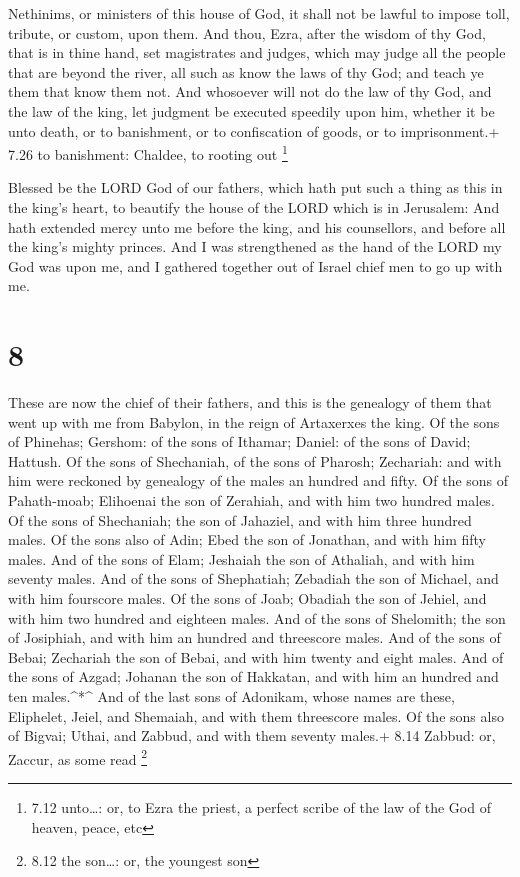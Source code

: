 Nethinims, or ministers of this house of God, it shall not be lawful to
impose toll, tribute, or custom, upon them.  And thou,
Ezra, after the wisdom of thy God, that is in thine hand, set
magistrates and judges, which may judge all the people that are beyond
the river, all such as know the laws of thy God; and teach ye them that
know them not.  And whosoever will not do the law of thy
God, and the law of the king, let judgment be executed speedily upon
him, whether it be unto death, or to banishment, or to confiscation of
goods, or to imprisonment.+ 7.26 to banishment: Chaldee, to rooting out
\footnote{7.12 unto\ldots: or, to Ezra the priest, a perfect scribe of
  the law of the God of heaven, peace, etc}

 Blessed be the LORD God of our fathers, which hath put
such a thing as this in the king's heart, to beautify the house of the
LORD which is in Jerusalem:  And hath extended mercy unto
me before the king, and his counsellors, and before all the king's
mighty princes. And I was strengthened as the hand of the LORD my God
was upon me, and I gathered together out of Israel chief men to go up
with me.

\hypertarget{section-7}{%
\section{8}\label{section-7}}

 These are now the chief of their fathers, and this is the
genealogy of them that went up with me from Babylon, in the reign of
Artaxerxes the king.  Of the sons of Phinehas; Gershom: of
the sons of Ithamar; Daniel: of the sons of David; Hattush. 
Of the sons of Shechaniah, of the sons of Pharosh; Zechariah: and with
him were reckoned by genealogy of the males an hundred and fifty.
 Of the sons of Pahath-moab; Elihoenai the son of Zerahiah,
and with him two hundred males.  Of the sons of Shechaniah;
the son of Jahaziel, and with him three hundred males.  Of
the sons also of Adin; Ebed the son of Jonathan, and with him fifty
males.  And of the sons of Elam; Jeshaiah the son of
Athaliah, and with him seventy males.  And of the sons of
Shephatiah; Zebadiah the son of Michael, and with him fourscore males.
 Of the sons of Joab; Obadiah the son of Jehiel, and with
him two hundred and eighteen males.  And of the sons of
Shelomith; the son of Josiphiah, and with him an hundred and threescore
males.  And of the sons of Bebai; Zechariah the son of
Bebai, and with him twenty and eight males.  And of the
sons of Azgad; Johanan the son of Hakkatan, and with him an hundred and
ten males.\^{}*\^{}  And of the last sons of Adonikam,
whose names are these, Eliphelet, Jeiel, and Shemaiah, and with them
threescore males.  Of the sons also of Bigvai; Uthai, and
Zabbud, and with them seventy males.+ 8.14 Zabbud: or, Zaccur, as some
read \footnote{8.12 the son\ldots: or, the youngest son}

